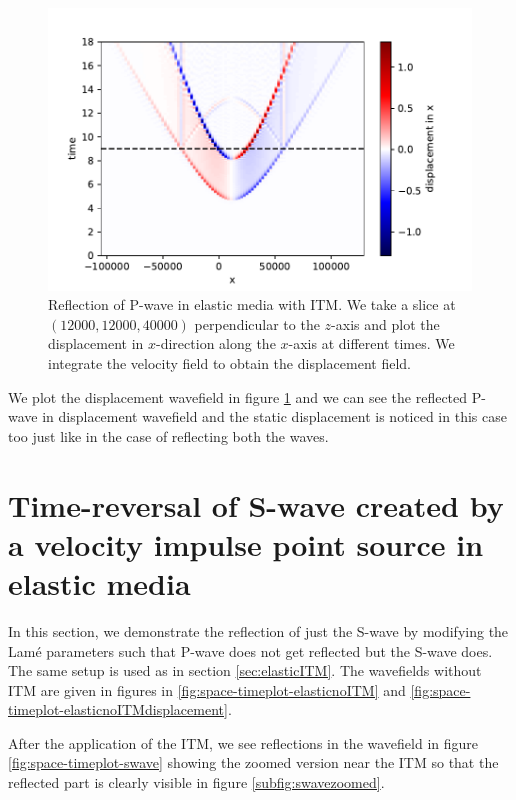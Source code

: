 \begin{figure}[htpb] %
    \centering
    \includegraphics[width=0.75\linewidth]{figures/pwave-ITMdisplacement.pdf}
    \caption{Reflection of P-wave in elastic media with \ac{ITM}. We take a slice at $\left(12000,12000,40000\right)$ perpendicular to the $z$-axis
    and plot the displacement in $x$-direction along the $x$-axis at different times. We integrate the velocity field to obtain the displacement field.}
    \label{fig:space-timeplot-pwavedisplacement}
\end{figure}

We plot the displacement wavefield in figure \ref{fig:space-timeplot-pwavedisplacement} and we can see the reflected P-wave in displacement wavefield and the static
displacement is noticed in this case too just like in the case of reflecting both the waves. 

\section{Time-reversal of S-wave created by a velocity impulse point source in elastic media} \label{sec:elasticITMswave}
In this section, we demonstrate the reflection of just the S-wave by modifying the Lam\'{e} parameters such that P-wave does not
get reflected but the S-wave does. The same setup is used as in section \ref{sec:elasticITM}. The wavefields without \ac{ITM} are given in figures in \ref{fig:space-timeplot-elasticnoITM}
and \ref{fig:space-timeplot-elasticnoITMdisplacement}.
\par After the application of the \ac{ITM}, we see reflections in the wavefield in figure \ref{fig:space-timeplot-swave} showing the zoomed version near the 
\ac{ITM} so that the reflected part is clearly visible in figure \ref{subfig:swavezoomed}.


